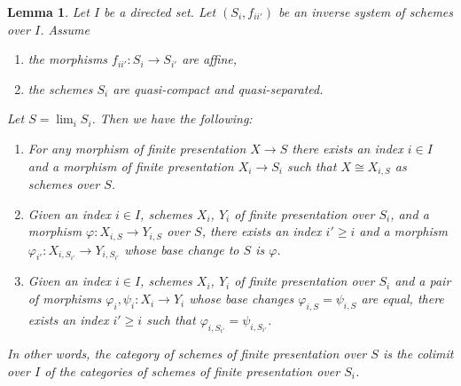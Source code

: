 \documentclass{amsart}
\theoremstyle{plain}
\newtheorem{lemma}[subsection]{Lemma}
\theoremstyle{definition}
\theoremstyle{remark}
\numberwithin{equation}{subsection}
\def\lim{\mathop{\mathrm{lim}}\nolimits}
\begin{document}
\begin{lemma}
\label{limits-lemma-descend-finite-presentation}
Let $I$ be a directed set.
Let $(S_i, f_{ii'})$ be an inverse system of schemes over $I$.
Assume
\begin{enumerate}
\item the morphisms $f_{ii'} : S_i \to S_{i'}$ are affine,
\item the schemes $S_i$ are quasi-compact and quasi-separated.
\end{enumerate}
Let $S = \lim_i S_i$. Then we have the following:
\begin{enumerate}
\item For any morphism of finite presentation $X \to S$
there exists an index $i \in I$ and a morphism of finite
presentation $X_i \to S_i$ such that $X \cong X_{i, S}$ as
schemes over $S$.
\item Given an index $i \in I$, schemes
$X_i$, $Y_i$ of finite presentation over $S_i$, and a morphism
$\varphi : X_{i, S} \to Y_{i, S}$ over $S$, there exists an index
$i' \geq i$ and a morphism
$\varphi_{i'} : X_{i, S_{i'}} \to Y_{i, S_{i'}}$
whose base change to $S$ is $\varphi$.
\item Given an index $i \in I$, schemes $X_i$, $Y_i$ of finite presentation
over $S_i$ and a pair of morphisms $\varphi_i, \psi_i : X_i \to Y_i$
whose base changes $\varphi_{i, S} = \psi_{i, S}$ are equal,
there exists an index $i' \geq i$ such that
$\varphi_{i, S_{i'}} = \psi_{i, S_{i'}}$.
\end{enumerate}
In other words, the category of schemes of finite presentation over
$S$ is the colimit over $I$ of the categories of schemes of finite
presentation over $S_i$.
\end{lemma}
\end{document}
